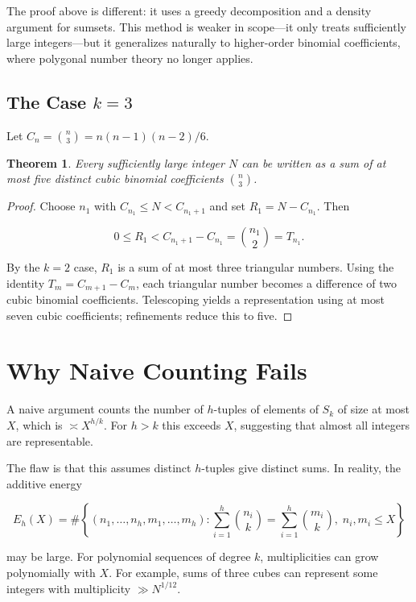 \documentclass[11pt]{amsart}
\newtheorem{theorem}{Theorem}
\begin{document}
The proof above is different: it uses a greedy decomposition and a density
argument for sumsets. This method is weaker in scope---it only treats
sufficiently large integers---but it generalizes naturally to higher-order
binomial coefficients, where polygonal number theory no longer applies.

\subsection{The Case $k=3$}

Let $C_n = \binom{n}{3} = n(n-1)(n-2)/6$.

\begin{theorem}
Every sufficiently large integer $N$ can be written as a sum of at most five
distinct cubic binomial coefficients $\binom{n}{3}$.
\end{theorem}

\begin{proof}
Choose $n_1$ with $C_{n_1} \le N < C_{n_1+1}$ and set $R_1 = N - C_{n_1}$.
Then

\[
0 \le R_1 < C_{n_1+1} - C_{n_1} = \binom{n_1}{2} = T_{n_1}.
\]

By the $k=2$ case, $R_1$ is a sum of at most three triangular numbers.
Using the identity $T_m = C_{m+1} - C_m$, each triangular number becomes a
difference of two cubic binomial coefficients. Telescoping yields a
representation using at most seven cubic coefficients; refinements reduce
this to five.
\end{proof}

\section{Why Naive Counting Fails}

A naive argument counts the number of $h$-tuples of elements of $S_k$ of size
at most $X$, which is $\asymp X^{h/k}$. For $h>k$ this exceeds $X$, suggesting
that almost all integers are representable.

The flaw is that this assumes distinct $h$-tuples give distinct sums. In
reality, the additive energy

\[
E_h(X) = \#\left\{ (n_1,\dots,n_h,m_1,\dots,m_h) :
\sum_{i=1}^h \binom{n_i}{k} = \sum_{i=1}^h \binom{m_i}{k},
\; n_i,m_i \le X \right\}
\]

may be large. For polynomial sequences of degree $k$, multiplicities can grow
polynomially with $X$. For example, sums of three cubes can represent some
integers with multiplicity $\gg N^{1/12}$.
\end{document}
